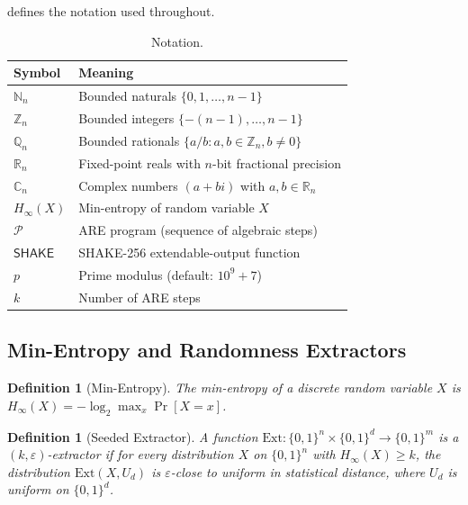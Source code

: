 \documentclass[conference,compsoc]{IEEEtran}
\newtheorem{definition}[theorem]{Definition}
\newcommand{\minentropy}{H_{\infty}}
\newcommand{\N}{\mathbb{N}}
\newcommand{\Z}{\mathbb{Z}}
\newcommand{\Q}{\mathbb{Q}}
\newcommand{\R}{\mathbb{R}}
\newcommand{\CC}{\mathbb{C}}
\begin{document}
 defines the notation used throughout.
\begin{table}[t]
  \centering
  \caption{Notation.}
  \label{tab:notation}
  \begin{tabular}{@{}ll@{}}
    \toprule
    Symbol & Meaning \\
    \midrule
    $\N_n$     & Bounded naturals $\{0, 1, \ldots, n-1\}$ \\
    $\Z_n$     & Bounded integers $\{-(n-1), \ldots, n-1\}$ \\
    $\Q_n$     & Bounded rationals $\{a/b : a,b \in \Z_n, b \neq 0\}$ \\
    $\R_n$     & Fixed-point reals with $n$-bit fractional precision \\
    $\CC_n$    & Complex numbers $(a + bi)$ with $a,b \in \R_n$ \\
    $\minentropy(X)$ & Min-entropy of random variable $X$ \\
    $\mathcal{P}$    & ARE program (sequence of algebraic steps) \\
    $\mathsf{SHAKE}$ & SHAKE-256 extendable-output function \\
    $p$              & Prime modulus (default: $10^9+7$) \\
    $k$              & Number of ARE steps \\
    \bottomrule
  \end{tabular}
\end{table}

\subsection{Min-Entropy and Randomness Extractors}
\label{sec:prelim:extractors}

\begin{definition}[Min-Entropy]
The min-entropy of a discrete random variable $X$ is
$\minentropy(X) = -\log_2 \max_x \Pr[X = x]$.
\end{definition}

\begin{definition}[Seeded Extractor]
A function $\mathrm{Ext}: \{0,1\}^n \times \{0,1\}^d \to \{0,1\}^m$
is a $(k, \varepsilon)$-extractor if for every distribution $X$ on
$\{0,1\}^n$ with $\minentropy(X) \geq k$, the distribution
$\mathrm{Ext}(X, U_d)$ is $\varepsilon$-close to uniform in
statistical distance, where $U_d$ is uniform on $\{0,1\}^d$.
\end{definition}
\end{document}
